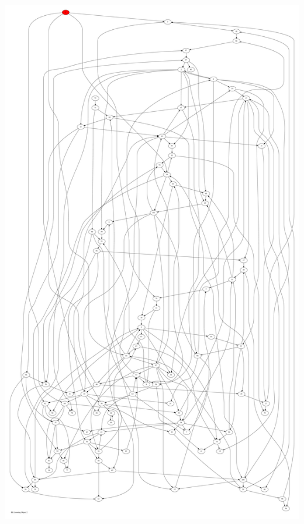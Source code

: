 \documentclass{article}
\begin{document}
\newpage
\includegraphics[max height=\textheight,max width=\textwidth]{bl_looming_objs/bl_loom_obj2_pp.pdf}
\end{document}
